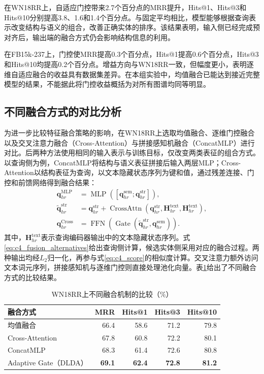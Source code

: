 在WN18RR上，自适应门控带来2.7个百分点的MRR提升，Hits@1、Hits@3和Hits@10分别提高3.8、1.6和1.4个百分点。与固定平均相比，模型能够根据查询表示改变结构与语义的组合，改善正确实体的排序。该结果表明，输入侧已经完成预对齐后，输出端的融合方式仍会影响结构信息的利用。

在FB15k-237上，门控使MRR提高0.3个百分点，Hits@1提高0.6个百分点，Hits@3和Hits@10均提高0.2个百分点。增益方向与WN18RR一致，但幅度更小，表明逐维自适应融合的收益具有数据集差异。在本组实验中，均值融合已能达到接近完整模型的结果，不能据此将门控收益概括为对所有图谱均同等明显。

\subsection{不同融合方式的对比分析}

为进一步比较特征融合策略的影响，在WN18RR上选取均值融合、逐维门控融合以及交叉注意力融合（Cross-Attention）与拼接感知机融合（ConcatMLP）进行对比。后两种方法使用相同的输入表示与训练目标，仅改变两类表征的组合方式。以查询侧为例，ConcatMLP将结构与语义表征拼接后输入两层MLP；Cross-Attention以结构表征为查询，以文本隐藏状态序列为键和值，通过残差连接、门控和前馈网络得到融合结果：
\begin{equation}
\begin{aligned}
    \mathbf{q}_{hr}^{\mathrm{MLP}}&=\operatorname{MLP}
       ([\mathbf{q}_{hr}^{\mathrm{sem}};\mathbf{q}_{hr}^{\mathrm{str}}]),\\
    \widetilde{\mathbf{q}}_{hr}^{\mathrm{str}}&=\mathbf{q}_{hr}^{\mathrm{str}}+
       \operatorname{CrossAttn}(\mathbf{q}_{hr}^{\mathrm{str}},\mathbf{H}_{hr}^{\mathrm{text}},\mathbf{H}_{hr}^{\mathrm{text}}),\\
    \mathbf{q}_{hr}^{\mathrm{Cross}}&=\operatorname{FFN}
       (\operatorname{Gate}(\widetilde{\mathbf{q}}_{hr}^{\mathrm{str}},\mathbf{q}_{hr}^{\mathrm{sem}})).
\end{aligned}
    \label{eq:c4_fusion_alternatives}
\end{equation}
其中，$\mathbf{H}_{hr}^{\mathrm{text}}$表示查询编码器输出中的文本隐藏状态序列。式\eqref{eq:c4_fusion_alternatives}给出查询侧计算，候选实体侧采用对应的融合过程。两种输出均经$L_2$归一化，再参与式\eqref{eq:c4_score}的相似度计算。交叉注意力额外访问文本词元序列，拼接感知机与逐维门控则直接处理池化向量。表\ref{tab:c4_fusion}给出了不同融合方式的比较结果。

\begin{table}[!htbp]
\centering
{}
\caption{WN18RR上不同融合机制的比较（\%）}
\label{tab:c4_fusion}
\begin{tabular}{lrrrr}
\toprule
融合方式 & MRR & Hits@1 & Hits@3 & Hits@10\\
\midrule
均值融合 & 66.4 & 58.6 & 71.2 & 79.8\\
Cross-Attention & 67.8 & 60.8 & 72.2 & 80.1\\
ConcatMLP & 68.3 & 61.4 & 72.6 & 80.8\\
Adaptive Gate（DLDA） & \textbf{69.1} & \textbf{62.4} & \textbf{72.8} & \textbf{81.2}\\
\bottomrule
\end{tabular}
\end{table}


